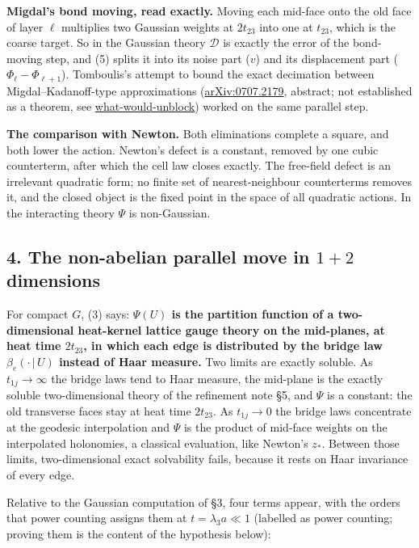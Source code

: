 \documentclass[11pt,a4paper]{article}
\begin{document}
\textbf{Migdal's bond moving, read exactly.} Moving each mid-face onto
the old face of layer \(\ell\) multiplies two Gaussian weights at
\(2t_{23}\) into one at \(t_{23}\), which is the coarse target. So in
the Gaussian theory \(\mathcal D\) is exactly the error of the
bond-moving step, and (5) splits it into its noise part (\(v\)) and its
displacement part (\(\Phi_\ell-\Phi_{\ell+1}\)). Tomboulis's attempt to
bound the exact decimation between Migdal--Kadanoff-type approximations
(\href{https://arxiv.org/abs/0707.2179}{arXiv:0707.2179}, abstract; not
established as a theorem, see
\href{mass-gap-openings.md\#tools-and-source-scope}{what-would-unblock})
worked on the same parallel step.

\textbf{The comparison with Newton.} Both eliminations complete a
square, and both lower the action. Newton's defect is a constant,
removed by one cubic counterterm, after which the cell law closes
exactly. The free-field defect is an irrelevant quadratic form; no
finite set of nearest-neighbour counterterms removes it, and the closed
object is the fixed point in the space of all quadratic actions. In the
interacting theory \(\Psi\) is non-Gaussian.

\hypertarget{the-non-abelian-parallel-move-in-12-dimensions}{%
\subsection{\texorpdfstring{4. The non-abelian parallel move in \(1+2\)
dimensions}{4. The non-abelian parallel move in 1+2 dimensions}}\label{the-non-abelian-parallel-move-in-12-dimensions}}

For compact \(G\), (3) says: \textbf{\(\Psi(U)\) is the partition
function of a two-dimensional heat-kernel lattice gauge theory on the
mid-planes, at heat time \(2t_{23}\), in which each edge is distributed
by the bridge law \(\beta_e(\cdot\,|\,U)\) instead of Haar measure.} Two
limits are exactly soluble. As \(t_{1j}\to\infty\) the bridge laws tend
to Haar measure, the mid-plane is the exactly soluble two-dimensional
theory of the refinement note §5, and \(\Psi\) is a constant: the old
transverse faces stay at heat time \(2t_{23}\). As \(t_{1j}\to0\) the
bridge laws concentrate at the geodesic interpolation and \(\Psi\) is
the product of mid-face weights on the interpolated holonomies, a
classical evaluation, like Newton's \(z_*\). Between those limits,
two-dimensional exact solvability fails, because it rests on Haar
invariance of every edge.

Relative to the Gaussian computation of §3, four terms appear, with the
orders that power counting assigns them at \(t=\lambda_3a\ll1\)
(labelled as power counting; proving them is the content of the
hypothesis below):
\end{document}
